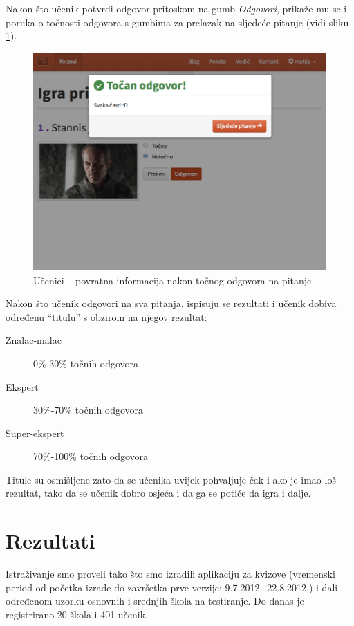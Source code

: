 \documentclass[11pt]{scrreprt}
\begin{document}
Nakon što učenik potvrdi odgovor pritoskom na gumb \emph{Odgovori}, prikaže mu
se i poruka o točnosti odgovora s gumbima za prelazak na sljedeće pitanje (vidi
sliku \ref{fig:feedback}).

\begin{figure}[H]
  \includegraphics[width=\textwidth, clip=true, trim=0 7cm 0 0, fbox]{student/boolean_question_correct}
  \caption{Učenici -- povratna informacija nakon točnog odgovora na pitanje}
  \label{fig:feedback}
\end{figure}

Nakon što učenik odgovori na sva pitanja, ispisuju se rezultati i učenik dobiva
određenu ``titulu'' s obzirom na njegov rezultat:

\begin{description}
  \item[Znalac-malac] 0\%-30\% točnih odgovora
  \item[Ekspert] 30\%-70\% točnih odgovora
  \item[Super-ekspert] 70\%-100\% točnih odgovora
\end{description}

Titule su osmišljene zato da se učenika uvijek pohvaljuje čak i ako je imao loš
rezultat, tako da se učenik dobro osjeća i da ga se potiče da igra i dalje.

\chapter{Rezultati}
\label{chap:results}

Istraživanje smo proveli tako što smo izradili aplikaciju za kvizove (vremenski
period od početka izrade do završetka prve verzije: 9.7.2012.--22.8.2012.) i dali
određenom uzorku osnovnih i srednjih škola na testiranje. Do danas je
registrirano 20 škola i 401 učenik.
\end{document}
